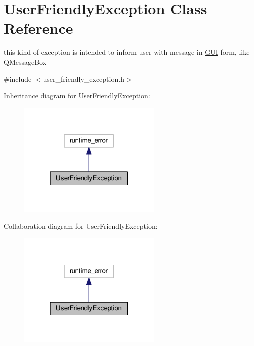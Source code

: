 \hypertarget{classUserFriendlyException}{}\section{User\+Friendly\+Exception Class Reference}
\label{classUserFriendlyException}


this kind of exception is intended to inform user with message in \hyperlink{namespaceGUI}{G\+UI} form, like Q\+Message\+Box  




{\ttfamily \#include $<$user\+\_\+friendly\+\_\+exception.\+h$>$}



Inheritance diagram for User\+Friendly\+Exception\+:\nopagebreak
\begin{figure}[H]
\begin{center}
\leavevmode
\includegraphics[width=196pt]{classUserFriendlyException__inherit__graph}
\end{center}
\end{figure}


Collaboration diagram for User\+Friendly\+Exception\+:\nopagebreak
\begin{figure}[H]
\begin{center}
\leavevmode
\includegraphics[width=196pt]{classUserFriendlyException__coll__graph}
\end{center}
\end{figure}
